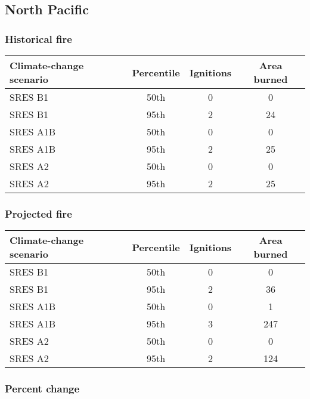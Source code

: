 \documentclass{article}\usepackage[]{graphicx}\usepackage[]{color}
\newcommand{\headcol}{\rowcolor{tableheadcolor}}
\begin{document}
\newpage
\pagebreak
\subsection{North Pacific}
\subsubsection{Historical fire}

\begin{table}[ht]
\centering
\begin{tabular}{lccc}
  \headcol 
 \toprule
Climate-change scenario & Percentile & Ignitions & Area burned \\ 
  \midrule
SRES B1 & 50th & 0 & 0 \\ 
  SRES B1 & 95th & 2 & 24 \\ 
  SRES A1B & 50th & 0 & 0 \\ 
  SRES A1B & 95th & 2 & 25 \\ 
  SRES A2 & 50th & 0 & 0 \\ 
  SRES A2 & 95th & 2 & 25 \\ 
   \bottomrule
\end{tabular}
\end{table}


\subsubsection{Projected fire}

\begin{table}[ht]
\centering
\begin{tabular}{lccc}
  \headcol 
 \toprule
Climate-change scenario & Percentile & Ignitions & Area burned \\ 
  \midrule
SRES B1 & 50th & 0 & 0 \\ 
  SRES B1 & 95th & 2 & 36 \\ 
  SRES A1B & 50th & 0 & 1 \\ 
  SRES A1B & 95th & 3 & 247 \\ 
  SRES A2 & 50th & 0 & 0 \\ 
  SRES A2 & 95th & 2 & 124 \\ 
   \bottomrule
\end{tabular}
\end{table}


\subsubsection{Percent change}
\end{document}
